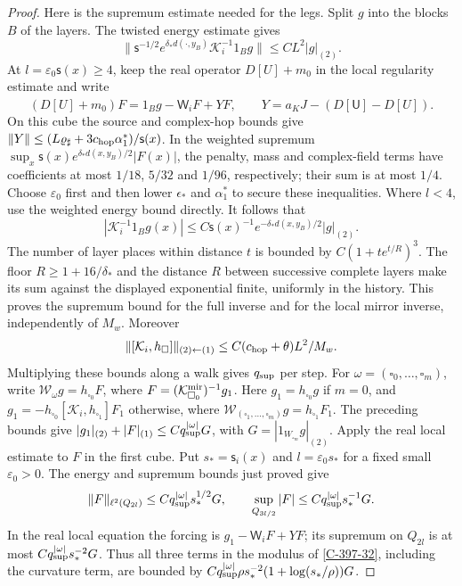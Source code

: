 \documentclass[11pt,letterpaper,reqno]{amsart}
\theoremstyle{definition}
\theoremstyle{remark}
\begin{document}
\begin{proof}
Here is the supremum estimate needed for the legs.  Split $g$ into
the blocks $B$ of the layers.  The twisted energy estimate gives
\[
 \|\mathsf s^{-1/2}e^{\delta_*d(\cdot,y_B)}
                 \mathcal K_i^{-1}1_Bg\|
       \le C L^2|g|_{(2)}.
\]
At $l=\varepsilon_0\mathsf s(x)\ge4$, keep the real operator
$D[U]+m_0$ in the local regularity estimate and write
\[
 (D[U]+m_0)F=1_Bg-\mathsf W_iF+YF,\qquad
 Y=a_K\hat J-(D[\mathsf U]-D[U]).
\]
On this cube the source and complex-hop bounds give
$\|Y\|\le(L\varrho_\sharp+3c_{\rm hop}\alpha_1^*)/\mathsf s(x)$.
In the weighted supremum
$\sup_x\mathsf s(x)e^{\delta_*d(x,y_B)/2}|F(x)|$, the penalty,
mass and complex-field terms have coefficients at most
$1/18$, $5/32$ and $1/96$, respectively; their sum is at most
$1/4$.  Choose $\varepsilon_0$ first and then lower
$\epsilon_*$ and $\alpha_1^*$ to secure these inequalities.
Where $l<4$, use the weighted energy bound directly.
It follows that
\[
 |\mathcal K_i^{-1}1_Bg(x)|\le
 C\mathsf s(x)^{-1}e^{-\delta_*d(x,y_B)/2}|g|_{(2)}.
\]
The number of layer places within distance $t$ is bounded by
$C(1+te^{t/R})^3$.  The floor $R\ge1+16/\delta_*$ and the
distance $R$ between successive complete layers make its sum
against the displayed exponential finite, uniformly in the
history.  This proves the supremum bound for the full inverse
and for the local mirror inverse, independently of $M_w$.
Moreover
\[
 \|[\mathcal K_i,h_\square]\|_{(2)\leftarrow(1)}
        \le C(c_{\rm hop}+\theta)L^2/M_w.
\]
Multiplying these bounds along a walk gives $q_{\rm sup}$ per
step. For $\omega=(\square_0,\ldots,\square_m)$, write
$\mathcal W_\omega g=h_{\square_0}F$, where
$F=(\mathcal K^{\rm mir}_{\square_0})^{-1}g_1$.
Here $g_1=h_{\square_0}g$ if $m=0$, and
$g_1=-h_{\square_0}[\mathcal K_i,h_{\square_1}]F_1$ otherwise,
where $\mathcal W_{(\square_1,\ldots,\square_m)}g
=h_{\square_1}F_1$. The preceding bounds give
$|g_1|_{(2)}+|F|_{(1)}\le Cq_{\rm sup}^{|\omega|}G$, with
$G=|1_{W_{\square_m}}g|_{(2)}$.
Apply the real local estimate to $F$ in the first cube.
Put $s_* =\mathsf s_i(x)$ and $l=\varepsilon_0s_*$ for a fixed small
$\varepsilon_0>0$.
The energy and supremum bounds just proved give
\[
 \|F\|_{\ell^2(Q_{2l})}\le Cq_{\rm sup}^{|\omega|}s_*^{1/2}G,
 \qquad \sup_{Q_{3l/2}}|F|\le Cq_{\rm sup}^{|\omega|}s_*^{-1}G.
\]
In the real local equation the forcing is $g_1-\mathsf W_iF+YF$;
its supremum on $Q_{2l}$ is at most
$Cq_{\rm sup}^{|\omega|}s_*^{-2}G$.
Thus all three terms in the modulus of \cref{C-397-32}, including
the curvature term, are bounded by
$Cq_{\rm sup}^{|\omega|}\rho s_*^{-2}(1+\log(s_*/\rho))G$.

\end{proof}
\end{document}
